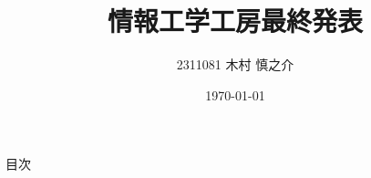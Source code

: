 \documentclass[uplatex,dvipdfmx, 10pt, aspectratio=43]{beamer}
\title{情報工学工房最終発表}
\author{2311081 木村 慎之介}
\institute{電気通信大学 情報理工学域 Ⅰ類 コンピュータサイエンスプログラム 3年}
\date{\today}
\begin{document}
\frame{\maketitle}

\begin{frame}{目次}
    \tableofcontents
\end{frame}










\end{document}
